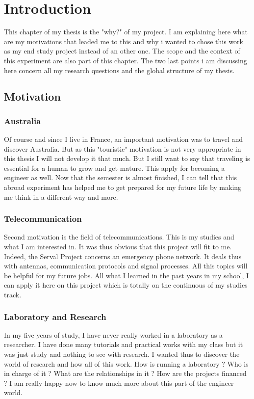 \chapter{Introduction}

This chapter of my thesis is the "why?" of my project. I am explaining here what are my motivations that leaded me to this and why i wanted to chose this work as my end study project instead of an other one. The scope and the context of this experiment are also part of this chapter. The two last points i am discussing here concern all my research questions and the global structure of my thesis.

\section{Motivation}

\subsection{Australia}
Of course and since I live in France, an important motivation was to travel and discover Australia. But as this "touristic" motivation is not very appropriate in this thesis I will not develop it that much. But I still want to say that traveling is essential for a human to grow and get mature. This apply for becoming a engineer as well. Now that the semester is almost finished, I can tell that this abroad experiment has helped me to get prepared for my future life by making me think in a different way and more.\\

\subsection{Telecommunication}
Second motivation is the field of telecommunications. This is my studies and what I am interested in. It was thus obvious that this project will fit to me. Indeed, the Serval Project concerns an emergency phone network. It deals thus with antennas, communication protocols and signal processes. All this topics will be helpful for my future jobs. All what I learned in the past years in my school, I can apply it here on this project which is totally on the continuous of my studies track. 

\subsection{Laboratory and Research}
In my five years of study, I have never really worked in a laboratory as a researcher. I have done many tutorials and practical works with my class but it was just study and nothing to see with research. I wanted thus to discover the world of research and how all of this work. How is running a laboratory ? Who is in charge of it ? What are the relationships in it ? How are the projects financed ? I am really happy now to know much more about this part of the engineer world. 

